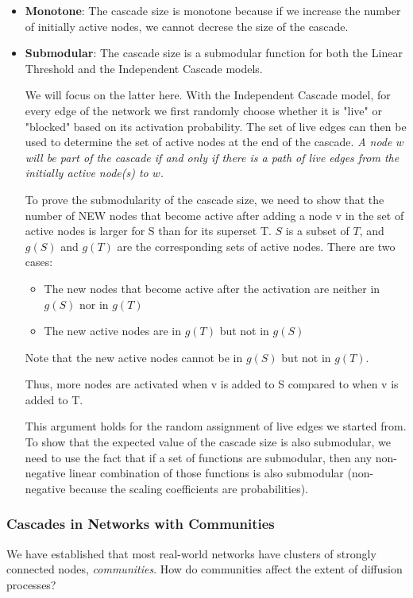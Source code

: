 \documentclass[11pt]{scrartcl} %
\begin{document}
\begin{itemize}
	\item \textbf{Monotone}: The cascade size is monotone because if we increase the number of initially active nodes, we cannot decrese the size of the cascade.
	\item \textbf{Submodular}: The cascade size is a submodular function for both the Linear Threshold and the Independent Cascade models. 

We will focus on the latter here. With the Independent Cascade model, for every edge of the network we first randomly choose whether it is "live" or "blocked" based on its activation probability. The set of live edges can then be used to determine the set of active nodes at the end of the cascade. \emph{A node $w$ will be part of the cascade if and only if there is a path of live edges from the initially active node(s) to $w$.}

To prove the submodularity of the cascade size, we need to show that the number of NEW nodes that become active after adding a node v in the set of active nodes is larger for S than for its superset T. $S$ is a subset of $T$, and $g(S)$ and $g(T)$ are the corresponding sets of active nodes. There are two cases:
	\begin{itemize}
		\item The new nodes that become active after the activation are neither in $g(S)$ nor in $g(T)$
		\item The new active nodes are in $g(T)$ but not in $g(S)$
	\end{itemize}
Note that the new active nodes cannot be in $g(S)$ but not in $g(T)$.

Thus, more nodes are activated when v is added to S compared to when v is added to T.

This argument holds for the random assignment of live edges we started from. To show that the expected value of the cascade size is also submodular, we need to use the fact that if a set of functions are submodular, then any non-negative linear combination of those functions is also submodular (non-negative because the scaling coefficients are probabilities).
\end{itemize}

\subsubsection{Cascades in Networks with Communities}
We have established that most real-world networks have clusters of strongly connected nodes, \emph{communities}. How do communities affect the extent of diffusion processes? 
\end{document}

